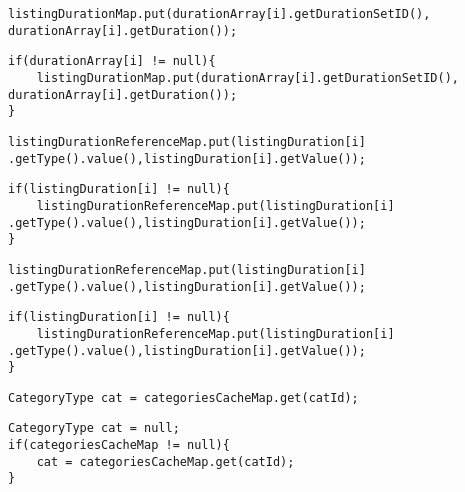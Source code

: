 \begin{lstlisting}[firstnumber=134, caption={getDurationSetID invocation}]
listingDurationMap.put(durationArray[i].getDurationSetID(), durationArray[i].getDuration());
\end{lstlisting}
\begin{lstlisting}[firstnumber=134, caption={getDurationSetID invocation possible solution}]
if(durationArray[i] != null){
    listingDurationMap.put(durationArray[i].getDurationSetID(), durationArray[i].getDuration());
}
\end{lstlisting}
\noindent\makebox[\linewidth]{\rule{\linewidth}{0.4pt}}

\begin{lstlisting}[firstnumber=144, caption={getType invocation}]
listingDurationReferenceMap.put(listingDuration[i] .getType().value(),listingDuration[i].getValue());
\end{lstlisting}
\begin{lstlisting}[firstnumber=144, caption={getType invocation possible solution}]
if(listingDuration[i] != null){
    listingDurationReferenceMap.put(listingDuration[i] .getType().value(),listingDuration[i].getValue());
}
\end{lstlisting}
\noindent\makebox[\linewidth]{\rule{\linewidth}{0.4pt}}

\begin{lstlisting}[firstnumber=144, caption={getValue invocation}]
listingDurationReferenceMap.put(listingDuration[i] .getType().value(),listingDuration[i].getValue());
\end{lstlisting}
\begin{lstlisting}[firstnumber=144, caption={getValue invocation possible solution}]
if(listingDuration[i] != null){
    listingDurationReferenceMap.put(listingDuration[i] .getType().value(),listingDuration[i].getValue());
}
\end{lstlisting}
\noindent\makebox[\linewidth]{\rule{\linewidth}{0.4pt}}

\begin{lstlisting}[firstnumber=192, caption={get invocation}]
CategoryType cat = categoriesCacheMap.get(catId);
\end{lstlisting}
\begin{lstlisting}[firstnumber=192, caption={get invocation possible solution}]
CategoryType cat = null;
if(categoriesCacheMap != null){
    cat = categoriesCacheMap.get(catId);
}
\end{lstlisting}
\noindent\makebox[\linewidth]{\rule{\linewidth}{0.4pt}}

